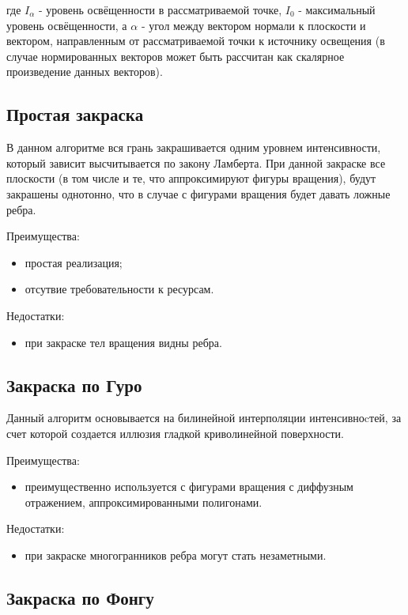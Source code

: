 где $I_{\alpha}$ - уровень освёщенности в рассматриваемой точке, $I_0$ -
максимальный уровень освёщенности, а $\alpha$ - угол между вектором нормали к
плоскости и вектором, направленным от рассматриваемой точки к источнику
освещения (в случае нормированных векторов может быть рассчитан как скалярное
произведение данных векторов).

\subsection{Простая закраска}

В данном алгоритме вся грань закрашивается одним уровнем интенсивности, который
зависит высчитывается по закону Ламберта. При данной закраске все
плоскости (в том числе и те, что аппроксимируют фигуры вращения), будут
закрашены однотонно, что в случае с фигурами вращения будет давать ложные
ребра.

Преимущества:
\begin{itemize}
    \item простая реализация;
    \item отсутвие требовательности к ресурсам.
\end{itemize}

Недостатки:

\begin{itemize}
    \item при закраске тел вращения видны ребра.
\end{itemize}

\subsection{Закраска по Гуро}

Данный алгоритм основывается на билинейной интерполяции интенсивноcтей, за счет
которой создается иллюзия гладкой криволинейной поверхности.

Преимущества:
\begin{itemize}
    \item преимущественно используется с фигурами вращения с диффузным
        отражением, аппроксимированными полигонами.
\end{itemize}

Недостатки:
\begin{itemize}
    \item при закраске многогранников ребра могут стать незаметными.
\end{itemize}

\subsection{Закраска по Фонгу}

